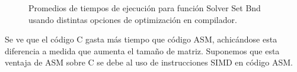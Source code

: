 \begin{figure}[htbp]
\centering


\caption{Promedios de tiempos de ejecución para función Solver Set Bnd usando distintas opciones de optimización en compilador.} \label{fig:lego}
\end{figure}

Se ve que el código C gasta más tiempo que código ASM, achicándose esta diferencia a medida que aumenta el tamaño de matriz. Suponemos que esta ventaja de ASM sobre C se debe al uso de instrucciones SIMD en código ASM.

